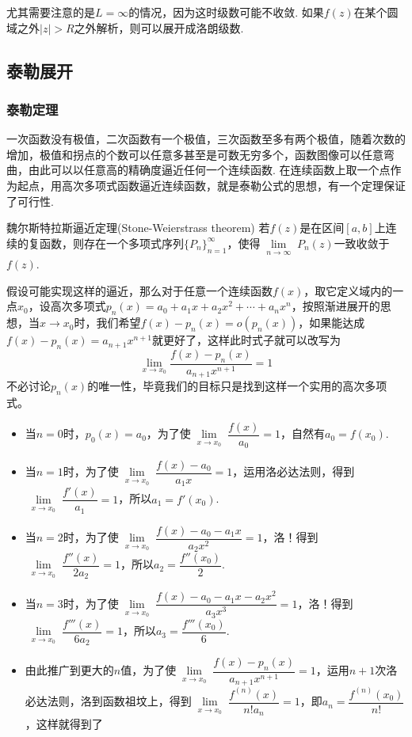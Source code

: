 尤其需要注意的是\(L=\infty\)的情况，因为这时级数可能不收敛. 如果\(f(z)\)在某个圆域之外\(|z| > R\)之外解析，则可以展开成洛朗级数.

\subsection{泰勒展开}

\subsubsection{泰勒定理}

一次函数没有极值，二次函数有一个极值，三次函数至多有两个极值，随着次数的增加，极值和拐点的个数可以任意多甚至是可数无穷多个，函数图像可以任意弯曲，由此可以以任意高的精确度逼近任何一个连续函数. 在连续函数上取一个点作为起点，用高次多项式函数逼近连续函数，就是泰勒公式的思想，有一个定理保证了可行性.

\begin{theorem}{魏尔斯特拉斯逼近定理(Stone-Weierstrass theorem)}
    若\(f(z)\)是在区间\([a,b]\)上连续的复函数，则存在一个多项式序列\(\{P_n\}_{n=1}^{\infty}\)，使得\(\lim \limits_{\substack{n \to \infty}} P_n(z)\)一致收敛于\(f(z)\).
\end{theorem}

假设可能实现这样的逼近，那么对于任意一个连续函数\(f(x)\)，取它定义域内的一点\(x_0\)，设高次多项式\(p_n(x)=a_0+a_1x+a_2x^2+\cdots+a_nx^n\)，按照渐进展开的思想，当\(x \to x_0\)时，我们希望\(f(x) - p_n(x) = o(p_n(x))\)，如果能达成\(f(x) - p_n(x) = a_{n+1}x^{n+1}\)就更好了，这样此时式子就可以改写为
\[\lim_{x \to x_0}\frac{f(x)-p_n(x)}{a_{n+1}x^{n+1}} = 1 \]
不必讨论\(p_n(x)\)的唯一性，毕竟我们的目标只是找到这样一个实用的高次多项式。
\begin{itemize}
    \item[\(\bullet\)] 当\(n=0\)时，\(p_0(x)=a_0\)，为了使\(\lim \limits_{\substack{x\to x_0}}\dfrac{f(x)}{a_0}=1\)，自然有\(a_0=f(x_0)\).
    \item[\(\bullet\)] 当\(n=1\)时，为了使\(\lim \limits_{\substack{x\to x_0}}\dfrac{f(x)-a_0}{a_1x}=1\)，运用洛必达法则，得到\(\lim \limits_{\substack{x\to x_0}}\dfrac{f'(x)}{a_1}=1\)，所以\(a_1=f'(x_0)\).
    \item[\(\bullet\)] 当\(n=2\)时，为了使\(\lim \limits_{\substack{x\to x_0}}\dfrac{f(x)-a_0-a_1x}{a_2x^2}=1\)，洛！得到\(\lim \limits_{\substack{x\to x_0}}\dfrac{f''(x)}{2a_2}=1\)，所以\(a_2=\dfrac{f''(x_0)}{2}\).
    \item[\(\bullet\)] 当\(n=3\)时，为了使\(\lim \limits_{\substack{x\to x_0}}\dfrac{f(x)-a_0-a_1x-a_2x^2}{a_3x^3}=1\)，洛！得到\(\lim \limits_{\substack{x\to x_0}}\dfrac{f'''(x)}{6a_2}=1\)，所以\(a_3=\dfrac{f'''(x_0)}{6}\).
    \item[\(\bullet\)] 由此推广到更大的\(n\)值，为了使\(\lim \limits_{\substack{x\to x_0}}\dfrac{f(x)-p_n(x)}{a_{n+1}x^{n+1}}=1\)，运用\(n+1\)次洛必达法则，洛到函数祖坟上，得到\(\lim \limits_{\substack{x\to x_0}}\dfrac{f^{(n)}(x)}{n!a_n}=1\)，即\(a_n=\dfrac{f^{(n)}(x_0)}{n!}\)，这样就得到了
\end{itemize}

